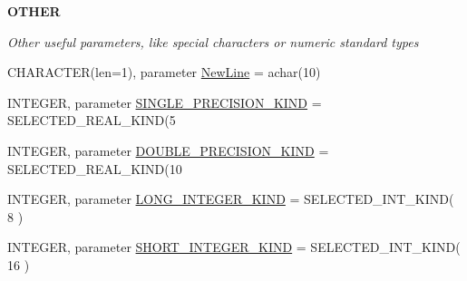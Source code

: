 \begin{Indent}{\bf OTHER}\par
{\em \label{_amgrp03570470bad94692ce93e32700d2e1cb}
Other useful parameters, like special characters or numeric standard types \par
 }\begin{DoxyCompactItemize}
\item 
CHARACTER(len=1), parameter \hyperlink{namespace_my_consts_a9a8e9aee6b2dd00efffbdb0957a48628}{NewLine} = achar(10)
\item 
INTEGER, parameter \hyperlink{namespace_my_consts_a293023fa7183e7f030a565aab4319d39}{SINGLE\_\-PRECISION\_\-KIND} = SELECTED\_\-REAL\_\-KIND(5
\item 
INTEGER, parameter \hyperlink{namespace_my_consts_a692521408a6d0a60e684c2dc67c804ab}{DOUBLE\_\-PRECISION\_\-KIND} = SELECTED\_\-REAL\_\-KIND(10
\item 
INTEGER, parameter \hyperlink{namespace_my_consts_a2d3348d585376d97fd760ceea81f0b65}{LONG\_\-INTEGER\_\-KIND} = SELECTED\_\-INT\_\-KIND( 8 )
\item 
INTEGER, parameter \hyperlink{namespace_my_consts_a12ff6515269f67ce554ac8d092a2119e}{SHORT\_\-INTEGER\_\-KIND} = SELECTED\_\-INT\_\-KIND( 16 )
\end{DoxyCompactItemize}
\end{Indent}


